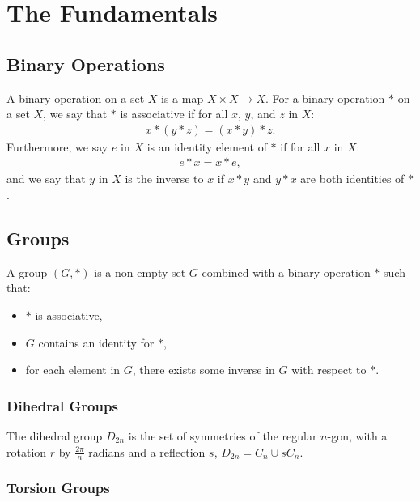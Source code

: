 \section{The Fundamentals}

\subsection{Binary Operations}

A binary operation on a set $X$ is a map $X \times X \to X$.
For a binary operation $\ast$ on a set $X$, we say that $\ast$ is 
associative if for all $x$, $y$, and $z$ in $X$: \begin{align*}
    x \ast (y \ast z) = (x \ast y) \ast z.
\end{align*} Furthermore, we say $e$ in $X$ is an identity element of $\ast$ if
for all $x$ in $X$: \begin{align*}
    e \ast x = x \ast e,
\end{align*} and we say that $y$ in $X$ is the inverse to $x$ if
$x \ast y$ and $y \ast x$ are both identities of $\ast$.

\subsection{Groups}

A group $(G, \ast)$ is a non-empty set $G$ combined with a binary operation
$\ast$ such that: \begin{itemize}
    \item $\ast$ is associative,
    \item $G$ contains an identity for $\ast$,
    \item for each element in $G$, there exists some inverse in $G$ 
        with respect to $\ast$.
\end{itemize}

\subsubsection{Dihedral Groups}

The dihedral group $D_{2n}$ is the set of symmetries of
the regular $n$-gon, with a rotation $r$ by $\frac{2\pi}{n}$
radians and a reflection $s$, $D_{2n} = C_n \cup sC_n$.

\subsubsection{Torsion Groups}

